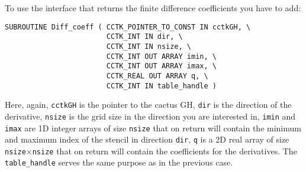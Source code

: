To use the interface that returns the finite difference coefficients you have 
to add:
\begin{verbatim}
SUBROUTINE Diff_coeff ( CCTK_POINTER_TO_CONST IN cctkGH, \
                        CCTK_INT IN dir, \
                        CCTK_INT IN nsize, \
                        CCTK_INT OUT ARRAY imin, \
                        CCTK_INT OUT ARRAY imax, \
                        CCTK_REAL OUT ARRAY q, \
                        CCTK_INT IN table_handle )
\end{verbatim}
Here, again, {\tt cctkGH} is the pointer to the cactus GH, {\tt dir} is the
direction of the derivative, {\tt nsize} is the grid size in the direction
you are interested in, {\tt imin} and {\tt imax} are 1D integer arrays of size
{\tt nsize} that on return will contain the minimum and maximum index of the
stencil in direction {\tt dir}, {\tt q} is a 2D real array of size 
{\tt nsize}$\times${\tt nsize} that on return will contain the coefficients
for the derivatives. The {\tt table\_handle} serves the same purpose as in
the previous case.



